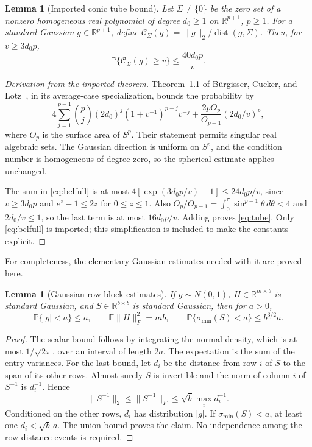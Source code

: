 \documentclass[11pt]{article}
\numberwithin{equation}{section}
\newtheorem{lemma}[theorem]{Lemma}
\theoremstyle{definition}
\newcommand{\R}{\mathbb R}
\newcommand{\E}{\mathbb E}
\newcommand{\Prob}{\mathbb P}
\newcommand{\dist}{\operatorname{dist}}
\newcommand{\sm}{\sigma_{\min}}
\newcommand{\nn}[1]{\lVert #1\rVert}
\begin{document}
\begin{lemma}[Imported conic tube bound]\label{lem:tube}
Let $\Sigma\ne\{0\}$ be the zero set of a nonzero homogeneous real polynomial of degree $d_0\ge1$ on $\R^{p+1}$, $p\ge1$. For a standard Gaussian $g\in\R^{p+1}$, define
$\mathscr C_\Sigma(g)=\nn g_2/\dist(g,\Sigma)$. Then, for $v\ge3d_0p$,
\begin{equation}\label{eq:tube}
\Prob\{\mathscr C_\Sigma(g)\ge v\}\le\frac{40d_0p}{v}.
\end{equation}
\end{lemma}
\begin{proof}[Derivation from the imported theorem]
Theorem~1.1 of B\"urgisser, Cucker, and Lotz~\cite{bcl}, in its average-case specialization, bounds the probability by
\begin{equation}\label{eq:bclfull}
4\sum_{j=1}^{p-1}\binom pj(2d_0)^j(1+v^{-1})^{p-j}v^{-j}
+\frac{2pO_p}{O_{p-1}}(2d_0/v)^p,
\end{equation}
where $O_p$ is the surface area of $S^p$. Their statement permits singular real algebraic sets. The Gaussian direction is uniform on $S^p$, and the condition number is homogeneous of degree zero, so the spherical estimate applies unchanged.

The sum in \eqref{eq:bclfull} is at most
$4[\exp(3d_0p/v)-1]\le24d_0p/v$, since $v\ge3d_0p$ and $e^z-1\le2z$ for $0\le z\le1$.
Also $O_p/O_{p-1}=\int_0^\pi\sin^{p-1}\theta\,d\theta<4$ and $2d_0/v\le1$, so the last term is at most $16d_0p/v$. Adding proves \eqref{eq:tube}.
Only \eqref{eq:bclfull} is imported; this simplification is included to make the constants explicit.
\end{proof}

For completeness, the elementary Gaussian estimates needed with it are proved here.

\begin{lemma}[Gaussian row-block estimates]\label{lem:gauss}
If $g\sim N(0,1)$, $H\in\R^{m\times b}$ is standard Gaussian, and $S\in\R^{b\times b}$ is standard Gaussian, then for $a>0$,
\begin{equation}\label{eq:gauss}
\Prob\{|g|<a\}\le a,\qquad \E\nn H_F^2=mb,
\qquad \Prob\{\sm(S)<a\}\le b^{3/2}a.
\end{equation}
\end{lemma}
\begin{proof}
The scalar bound follows by integrating the normal density, which is at most $1/\sqrt{2\pi}$, over an interval of length $2a$. The expectation is the sum of the entry variances.
For the last bound, let $d_i$ be the distance from row $i$ of $S$ to the span of its other rows. Almost surely $S$ is invertible and the norm of column $i$ of $S^{-1}$ is $d_i^{-1}$. Hence
\[
\nn{S^{-1}}_2\le\nn{S^{-1}}_F\le\sqrt b\max_i d_i^{-1}.
\]
Conditioned on the other rows, $d_i$ has distribution $|g|$. If $\sm(S)<a$, at least one $d_i<\sqrt b\,a$. The union bound proves the claim. No independence among the row-distance events is required.
\end{proof}
\end{document}
